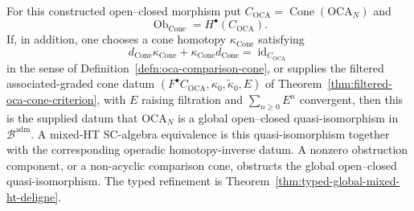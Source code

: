 \documentclass[11pt]{memoir}
\begin{document}
\begin{thm}
	  For this constructed open--closed morphism put
	  \(C_{\mathrm{OCA}}=\operatorname{Cone}(\mathrm{OCA}_N)\) and
	  \[
	    \operatorname{Ob}_{\operatorname{Cone}}
	    =
	    H^\bullet(C_{\mathrm{OCA}}).
	  \]
	  If, in addition, one chooses a cone homotopy
	  \(\kappa_{\operatorname{Cone}}\) satisfying
	  \[
	    d_{\operatorname{Cone}}\kappa_{\operatorname{Cone}}
	    +\kappa_{\operatorname{Cone}}d_{\operatorname{Cone}}
    =
	    \operatorname{id}_{C_{\mathrm{OCA}}}
	  \]
	  in the sense of Definition~\ref{defn:oca-comparison-cone}, or supplies
	  the filtered associated-graded cone datum
	  \((F^\bullet C_{\mathrm{OCA}},\kappa_0,\widetilde\kappa_0,E)\) of
	  Theorem~\ref{thm:filtered-oca-cone-criterion}, with \(E\) raising
	  filtration and \(\sum_{n\ge0}E^n\) convergent, then
	  this is the supplied datum that \(\mathrm{OCA}_N\) is a global
	  open--closed quasi-isomorphism in \(\mathcal B^{\mathrm{adm}}\).  A
	  mixed-HT \(\mathrm{SC}\)-algebra equivalence is this
	  quasi-isomorphism together with the corresponding operadic
  homotopy-inverse datum.  A nonzero obstruction component, or a
  non-acyclic comparison cone, obstructs the global open--closed
  quasi-isomorphism.  The typed refinement is
  Theorem~\ref{thm:typed-global-mixed-ht-deligne}.


\end{thm}
\end{document}
